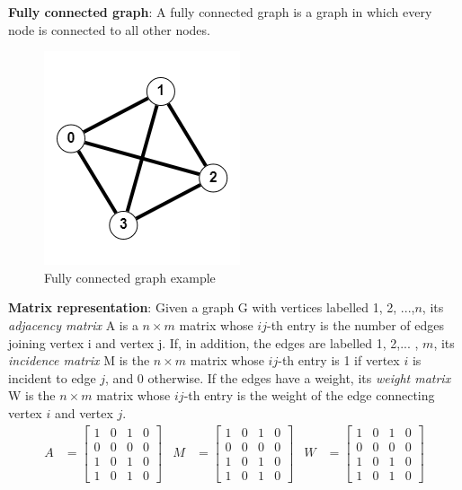 \documentclass[\main/main.tex]{subfiles}
\begin{document}
\textbf{Fully connected graph}:
A fully connected graph is a graph in which every node is connected to all other nodes. \cite{Siu1998IntroductionTG}
\begin{center}
    \begin{figure}[h]
    \centering
    \includegraphics[scale=1]{images/methods/fully_connected_graph_example.png}
    \caption{Fully connected graph example}
    \label{fig:fully_connected_graph_example}
\end{figure}
\end{center}
\textbf{Matrix representation}: 
Given a graph G with vertices labelled {1, 2, ...,$n$}, its \textit{adjacency matrix} A is a $n \times m$ matrix whose $ij$-th entry is the number of edges joining vertex i and vertex j. If, in addition, the edges are labelled {1, 2,... , $m$}, its \textit{incidence matrix} M is the $n \times m$ matrix whose $ij$-th entry is 1 if vertex $i$ is incident to edge $j$, and 0 otherwise. If the edges have a weight, its \textit{weight matrix} W is the $n \times m$ matrix whose $ij$-th entry is the weight of the edge connecting vertex $i$ and vertex $j$.
\begin{align}
A &= \begin{bmatrix}
    1 & 0 & 1 & 0\\
    0 & 0 & 0 & 0\\
    1 & 0 & 1 & 0\\
    1 & 0 & 1 & 0
\end{bmatrix}
&
M &= \begin{bmatrix}
    1 & 0 & 1 & 0\\
    0 & 0 & 0 & 0\\
    1 & 0 & 1 & 0\\
    1 & 0 & 1 & 0
\end{bmatrix}
&
W &= \begin{bmatrix}
    1 & 0 & 1 & 0\\
    0 & 0 & 0 & 0\\
    1 & 0 & 1 & 0\\
    1 & 0 & 1 & 0
\end{bmatrix}
\end{align}
\end{document}
